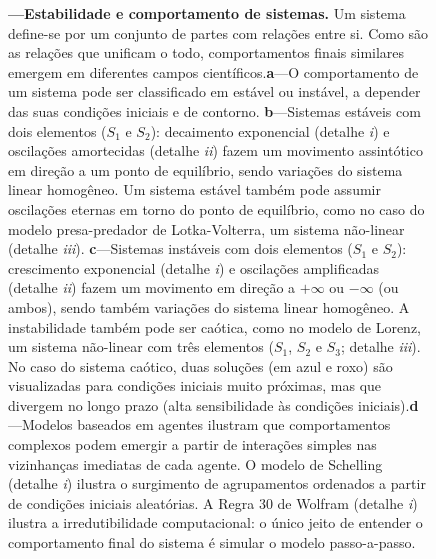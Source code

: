 \documentclass[./main.tex]{subfiles}
\begin{document}
\begin{figure}[t!]
	{\textbf{---\;Estabilidade e comportamento de sistemas.} Um sistema define-se por um conjunto de partes com relações entre si. Como são as relações que unificam o todo, comportamentos finais similares emergem em diferentes campos científicos.\;\textbf{a}\;---\;O comportamento de um sistema pode ser classificado em estável ou instável, a depender das suas condições iniciais e de contorno. \;\textbf{b}\;---\;Sistemas estáveis com dois elementos ($S_1$ e $S_2$): decaimento exponencial (detalhe \textrm{\textit{i}}) e oscilações amortecidas (detalhe \textrm{\textit{ii}}) fazem um movimento assintótico em direção a um ponto de equilíbrio, sendo variações do sistema linear homogêneo. Um sistema estável também pode assumir oscilações eternas em torno do ponto de equilíbrio, como no caso do modelo presa-predador de Lotka-Volterra, um sistema não-linear (detalhe \textrm{\textit{iii}}). \;\textbf{c}\;---\;Sistemas instáveis com dois elementos ($S_1$ e $S_2$): crescimento exponencial (detalhe \textrm{\textit{i}}) e oscilações amplificadas (detalhe \textrm{\textit{ii}}) fazem um movimento em direção a $+\infty$ ou $-\infty$ (ou ambos), sendo também variações do sistema linear homogêneo. A instabilidade também pode ser caótica, como no modelo de Lorenz, um sistema não-linear com três elementos ($S_1$, $S_2$ e $S_3$; detalhe \textrm{\textit{iii}}). No caso do sistema caótico, duas soluções (em azul e roxo) são visualizadas para condições iniciais muito próximas, mas que divergem no longo prazo (alta sensibilidade às condições iniciais).\;\textbf{d}\;---\;Modelos baseados em agentes ilustram que comportamentos complexos podem emergir a partir de interações simples nas vizinhanças imediatas de cada agente. O modelo de Schelling (detalhe \textrm{\textit{i}}) ilustra o surgimento de agrupamentos ordenados a partir de condições iniciais aleatórias. A Regra 30 de Wolfram (detalhe \textrm{\textit{i}}) ilustra a irredutibilidade computacional: o único jeito de entender o comportamento final do sistema é simular o modelo passo-a-passo. 
	}
\label{fig:sys:systems}  %
\end{figure}
\end{document}
